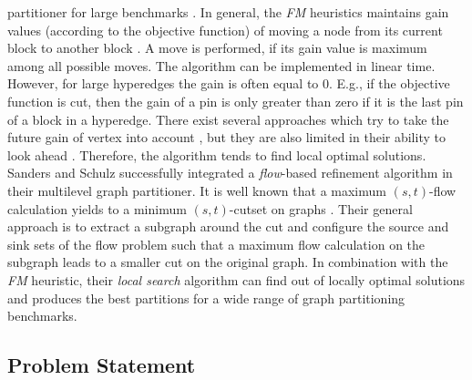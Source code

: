 partitioner for large benchmarks \cite{papa2007hypergraph}. In general, the \emph{FM}
heuristics maintains gain values (according to the objective function) of moving a node
from its current block to another block \cite{fiduccia1988linear}. A move is performed, 
if its gain value is maximum among all possible moves. The algorithm can be implemented 
in linear time. However, for large hyperedges the gain is often equal to $0$. E.g., if
the objective function is cut, then the gain of a pin is only greater than zero if it is the
last pin of a block in a hyperedge. There exist several approaches which try to take the
future gain of vertex into account \cite{krishnamurthy1984improved}, but they are also
limited in their ability to look ahead \cite{zhao2002effective}. Therefore, the algorithm
tends to find local optimal solutions. \\
Sanders and Schulz \cite{sanders2011engineering} successfully integrated a \emph{flow}-based refinement
algorithm in their multilevel graph partitioner. It is well known that a maximum $(s,t)$-flow
calculation yields to a minimum $(s,t)$-cutset on graphs \cite{ford1956maximal}. Their general
approach is to extract a subgraph around the cut and configure the source and sink sets
of the flow problem such that a maximum flow calculation on the subgraph leads to a 
smaller cut on the original graph. In combination with the \emph{FM} heuristic, their \emph{local
search} algorithm can find out of locally optimal solutions and produces
the best partitions for a wide range of graph partitioning benchmarks. 

\subsection{Problem Statement}


